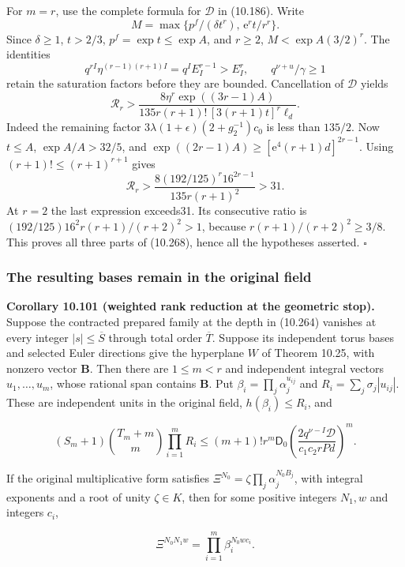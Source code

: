 \documentclass[
  11pt,
  a4paper,
]{article}
\begin{document}
For \(m=r\), use the complete formula for \(\mathcal D\) in (10.186).
Write \[
M=\max\{p^f/(\delta t^r),\,\mathrm e^rt/r^r\}.
\] Since \(\delta\ge1\), \(t>2/3\), \(p^f=\exp t\le\exp A\), and
\(r\ge2\), \(M<\exp A(3/2)^r\). The identities \[
q^{rI}\eta^{(r-1)(r+1)I}=q^I E_I^{r-1}>E_I^r,
\qquad q^{\nu+u}/\gamma\ge1
\] retain the saturation factors before they are bounded. Cancellation
of \(\mathcal D\) yields \[
\mathcal R_r>
\frac{8\eta^r\exp((3r-1)A)}
{135r(r+1)!\,[3(r+1)t]^r\ell_d}.
\] Indeed the remaining factor \(3\lambda(1+\epsilon)(2+g_2^{-1})c_0\)
is less than \(135/2\). Now \(t\le A\), \(\exp A/A>32/5\), and
\(\exp((2r-1)A)\ge[\mathrm e^4(r+1)d]^{2r-1}\). Using
\((r+1)!\le(r+1)^{r+1}\) gives \[
\mathcal R_r>
\frac{8(192/125)^r16^{2r-1}}{135r(r+1)^2}>31.
\] At \(r=2\) the last expression exceeds31. Its consecutive ratio is
\((192/125)16^2r(r+1)/(r+2)^2>1\), because \(r(r+1)/(r+2)^2\ge3/8\).
This proves all three parts of (10.268), hence all the hypotheses
asserted. \(\square\)

\subsubsection{The resulting bases remain in the original
field}\label{the-resulting-bases-remain-in-the-original-field}

\textbf{Corollary 10.101 (weighted rank reduction at the geometric
stop).} Suppose the contracted prepared family at the depth in (10.264)
vanishes at every integer \(|s|\le\overline S\) through total order
\(\overline T\). Suppose its independent torus bases and selected Euler
directions give the hyperplane \(W\) of Theorem 10.25, with nonzero
vector \(\boldsymbol B\). Then there are \(1\le m<r\) and independent
integral vectors \(u_1,\ldots,u_m\), whose rational span contains
\(\boldsymbol B\). Put \(\beta_i=\prod_j\alpha_j^{u_{ij}}\) and
\(R_i=\sum_j\sigma_j|u_{ij}|\). These are independent units in the
original field, \(h(\beta_i)\le R_i\), and

\[
(S_m+1)\binom{T_m+m}{m}\prod_{i=1}^m R_i
\le(m+1)!r^m\mathsf D_0
\left(\frac{2q^{\nu-I}\mathcal D}{c_1c_2rPd}\right)^m.
\tag{10.270}
\]

If the original multiplicative form satisfies
\(\Xi^{N_0}=\zeta\prod_j\alpha_j^{N_0B_j}\), with integral exponents and
a root of unity \(\zeta\in K\), then for some positive integers
\(N_1,w\) and integers \(c_i\),

\[
\Xi^{N_0N_1w}=\prod_{i=1}^m\beta_i^{N_0wc_i}.
\tag{10.271}
\]
\end{document}
